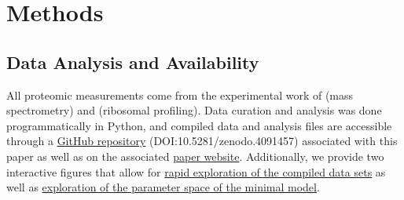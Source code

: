 \section{Methods}

\subsection{Data Analysis and Availability}
All proteomic measurements come from the experimental work of \cite{schmidt2016,
peebo2015, valgepea2013} (mass spectrometry) and \cite{li2014} (ribosomal
profiling). Data curation and analysis was done programmatically in Python, and
compiled data and analysis files are accessible through a
\href{https://github.com/rpgroup-pboc/growth_limits}{GitHub repository}
(DOI:10.5281/zenodo.4091457) associated with this paper as well as on the associated
\href{https://rpgroup.caltech.edu/growth_limits}{paper website}. Additionally,
we provide two interactive figures that allow for
\href{https://rpgroup.caltech.edu/growth_limits/data_explorer}{rapid exploration of the
compiled data sets} as well as
\href{https://rpgroup.caltech.edu/growth_limits/model_explorer}{exploration of the parameter
space of the minimal model}. 

